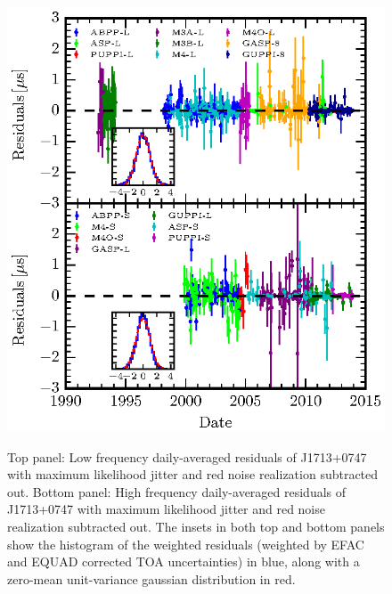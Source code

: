 \documentclass[12pt,preprint]{aastex}
\begin{document}
\begin{figure}
\includegraphics[scale=1.0]{fig4.eps} \\ 
\caption{\label{fig:detres} Top panel: Low frequency daily-averaged residuals of J1713+0747 with maximum likelihood
jitter and red noise realization subtracted out. Bottom panel: High frequency daily-averaged residuals of J1713+0747 with maximum likelihood jitter and red noise realization subtracted out. The insets in both top and bottom panels show the histogram of the weighted residuals (weighted by EFAC and EQUAD corrected TOA uncertainties) in blue, along with a zero-mean unit-variance gaussian distribution in red.}
\end{figure} 

\end{document}
